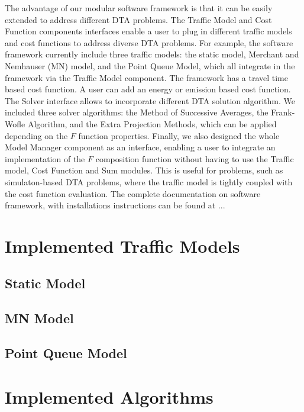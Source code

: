 \documentclass[conference]{IEEEtran}
\renewcommand{\:}{\mathrel{\coloneqq}}
\renewcommand{\=}{\ensuremath{\eqqcolon}}
\newcommand{\0}{\ensuremath{\boldsymbol{0}}}
\begin{document}
The advantage of our modular software framework is that it can be easily extended to address different DTA problems. The Traffic Model and Cost Function components interfaces enable a user to plug in different traffic models and cost functions to address diverse DTA problems. For example, the software framework currently include three traffic models: the static model, Merchant and Nemhauser (MN) model, and the Point Queue Model, which all integrate in the framework via the Traffic Model component. The framework has a travel time based cost function. A user can add an energy or emission based cost function. The Solver interface allows to incorporate different DTA solution algorithm. We included three solver algorithms: the Method of Successive Averages, the Frank-Wofle Algorithm, and the Extra Projection Methods, which can be applied depending on the $F$ function properties. Finally, we also designed the whole Model Manager component as an interface, enabling a user to integrate an implementation of the $F$ composition function without having to use the Traffic model, Cost Function and Sum modules. This is useful for problems, such as simulaton-based DTA problems, where the traffic model is tightly coupled with the cost function evaluation. The complete documentation on software framework, with installations instructions can be found at ...

\section{Implemented Traffic Models}
\subsection{Static Model}
\subsection{MN Model}
\subsection{Point Queue Model}

\section{Implemented Algorithms}
\end{document}
